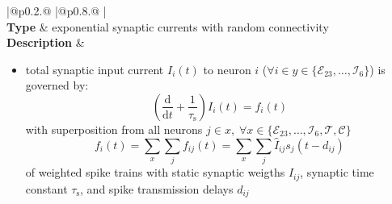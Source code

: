 \documentclass[10pt,a4paper,twoside,american]{article}
\theoremstyle{definitionstyle}
\newcommand{\diff}{\ensuremath{\text{d}}}
\newcommand{\tauS}{\tau_\text{s}}
\begin{document}
\begin{table}
\begin{tabular}{
  |@{\hspace*{\marg}}p{}@{\hspace*{\marg}}
  |@{\hspace*{\marg}}p{}@{\hspace*{\marg}}
  |}
  \hline 
  \\
  \hline 
  \textbf{Type} & exponential synaptic currents with random connectivity \\
  \hline 
  \textbf{Description} &
  \begin{itemize}
	\item total synaptic input current $I_i(t)$ to neuron $i$ ($\forall i \in y\in\{\mathcal{E}_{23},\ldots,\mathcal{I}_{6}\}$) is governed by:
		\begin{equation}
			\label{eq:synaptic_current}
			\left(\frac{\diff}{\diff t} + \frac{1}{\tauS}\right) I_{i} (t) = f_{i}(t)
		\end{equation}
		with superposition from all neurons $j \in x,\;\forall x\in\{\mathcal{E}_{23},\ldots,\mathcal{I}_{6}, \mathcal{T}, \mathcal{C}\}$
		\begin{equation*}
			f_{i} (t) = \sum_{x} \sum_{j} f_{ij} (t) = \sum_{x} \sum_{j} \hat{I}_{ij} s_{j}(t-d_{ij})
		\end{equation*}
		  of weighted spike trains with static synaptic weigths $\hat{I}_{ij}$, synaptic time constant $\tauS$, and spike transmission delays $d_{ij}$
		

\end{itemize}
\end{tabular}
\end{table}
\end{document}
